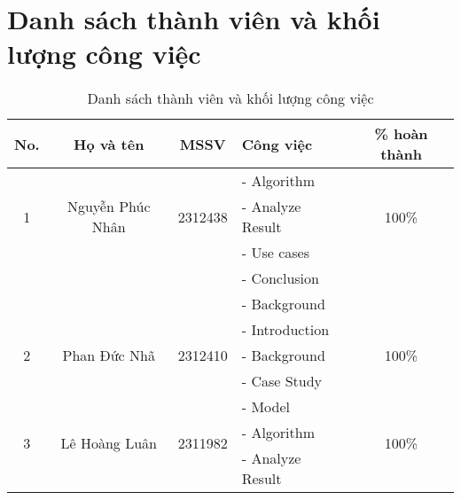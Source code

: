 \section*{Danh sách thành viên và khối lượng công việc}
\begin{center}
    \begin{table}[h]
        \centering
        \begin{tabular}{|c|c|c|l|c|}
        
            \hline
            \textbf{No.} & \textbf{Họ và tên} & \textbf{MSSV} & \textbf{Công việc} & \textbf{\% hoàn thành}\\
            \hline 
        
            \multirow{3}{*}{1} & \multirow{3}{*}{Nguyễn Phúc Nhân} & \multirow{3}{*}{2312438} & 
            - Algorithm& \multirow{3}{*}{100\%}\\
             & &  & - Analyze Result&\\
             & &  & - Use cases&\\
             & &  & - Conclusion&\\
             & &  & - Background&\\
            \hline 
        
            \multirow{3}{*}{2} & \multirow{3}{*}{Phan Đức Nhã} & \multirow{3}{*}{2312410} & 
            - Introduction& \multirow{3}{*}{100\%}\\
             & &  & - Background&\\
             & &  & - Case Study&\\
            \hline
        
            \multirow{3}{*}{3} & \multirow{3}{*}{Lê Hoàng Luân} & \multirow{3}{*}{2311982} & 
            - Model& \multirow{3}{*}{100\%}\\
             & &  & - Algorithm&\\
             & &  & - Analyze Result&\\
            \hline
            
        \end{tabular}
    \caption{\label{table1}Danh sách thành viên và khối lượng công việc}
    \end{table}
\end{center}


\pagebreak
